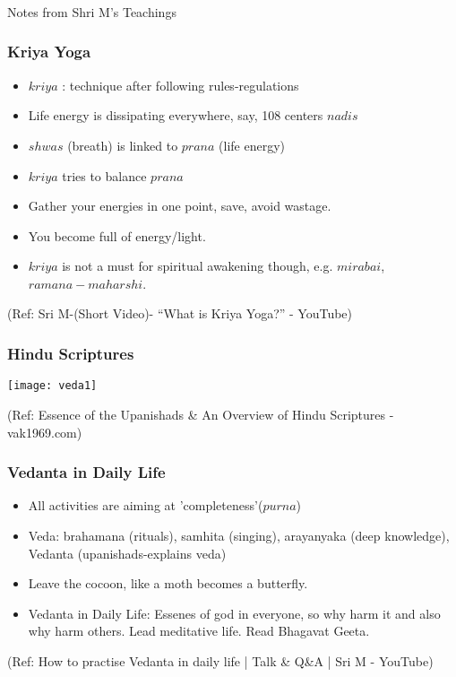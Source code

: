 \begin{frame}[fragile]\frametitle{}
\begin{center}
{\Large Notes from Shri M's Teachings}
\end{center}
\end{frame}

\begin{frame}[fragile]\frametitle{Kriya Yoga}

	\begin{itemize}
	\item $kriya$ : technique after following rules-regulations
	\item Life energy is dissipating everywhere, say, 108 centers $nadis$
	\item $shwas$ (breath) is linked to $prana$ (life energy)
	\item $kriya$ tries to balance $prana$
	\item Gather your energies in one point, save, avoid wastage. 
	\item You become full of energy/light.
	\item $kriya$ is not a must for spiritual awakening though, e.g. $mirabai$, $ramana-maharshi$.
	\end{itemize}

{\tiny (Ref: Sri M-(Short Video)- ``What is Kriya Yoga?'' - YouTube)}

\end{frame}


\begin{frame}[fragile]\frametitle{Hindu Scriptures}

\begin{center}
\texttt{[image: veda1]}
\end{center}	 

{\tiny (Ref: Essence of the Upanishads \& An Overview of Hindu Scriptures - vak1969.com)}

\end{frame}

\begin{frame}[fragile]\frametitle{Vedanta in Daily Life}

	\begin{itemize}
	\item All activities are aiming at 'completeness'($purna$)
	\item Veda: brahamana (rituals), samhita (singing), arayanyaka (deep knowledge), Vedanta (upanishads-explains veda)
	\item Leave the cocoon, like a moth becomes a butterfly.
	\item Vedanta in Daily Life: Essenes of god in everyone, so why harm it and also why harm others. Lead meditative life. Read Bhagavat Geeta.
	\end{itemize}

{\tiny (Ref: How to practise Vedanta in daily life | Talk \& Q\&A | Sri M - YouTube)}

\end{frame}


